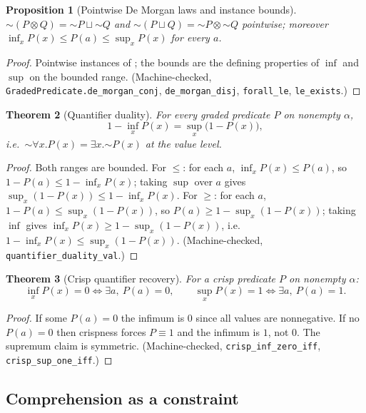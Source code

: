 \documentclass[11pt,a4paper]{article}
\newtheorem{theorem}{Theorem}[section]
\newtheorem{proposition}[theorem]{Proposition}
\newcommand{\negc}{\mathord{\sim}}
\newcommand{\conjc}{\otimes}
\newcommand{\disjc}{\sqcup}
\begin{document}
\begin{proposition}[Pointwise De Morgan laws and instance bounds]
\label{prop:pred-demorgan}
$\negc(P \conjc Q) = \negc P \disjc \negc Q$ and
$\negc(P \disjc Q) = \negc P \conjc \negc Q$ pointwise; moreover
$\inf_x P(x) \leq P(a) \leq \sup_x P(x)$ for every $a$.
\end{proposition}
\begin{proof}
Pointwise instances of ; the bounds are the defining
properties of $\inf$ and $\sup$ on the bounded range.
(Machine-checked, \texttt{GradedPredicate.de\_morgan\_conj},
\texttt{de\_morgan\_disj}, \texttt{forall\_le}, \texttt{le\_exists}.)
\end{proof}

\begin{theorem}[Quantifier duality]
\label{thm:quant-duality}
For every graded predicate $P$ on nonempty $\alpha$,
\[
  1 - \inf_{x} P(x) = \sup_{x} \bigl(1 - P(x)\bigr),
\]
i.e.\ $\negc \forall x. P(x) = \exists x. \negc P(x)$ at the value
level.
\end{theorem}
\begin{proof}
Both ranges are bounded.
For $\leq$: for each $a$, $\inf_x P(x) \leq P(a)$, so
$1 - P(a) \leq 1 - \inf_x P(x)$; taking $\sup$ over $a$ gives
$\sup_x (1 - P(x)) \leq 1 - \inf_x P(x)$.
For $\geq$: for each $a$,
$1 - P(a) \leq \sup_x(1 - P(x))$, so
$P(a) \geq 1 - \sup_x(1 - P(x))$; taking $\inf$ gives
$\inf_x P(x) \geq 1 - \sup_x(1 - P(x))$, i.e.\
$1 - \inf_x P(x) \leq \sup_x(1 - P(x))$.
(Machine-checked, \texttt{quantifier\_duality\_val}.)
\end{proof}

\begin{theorem}[Crisp quantifier recovery]
\label{thm:crisp-quant}
For a crisp predicate $P$ on nonempty $\alpha$:
\[
  \inf_x P(x) = 0 \iff \exists a,\ P(a) = 0,
  \qquad
  \sup_x P(x) = 1 \iff \exists a,\ P(a) = 1.
\]
\end{theorem}
\begin{proof}
If some $P(a) = 0$ the infimum is $0$ since all values are
nonnegative.
If no $P(a) = 0$ then crispness forces $P \equiv 1$ and the infimum is
$1$, not $0$.
The supremum claim is symmetric.
(Machine-checked, \texttt{crisp\_inf\_zero\_iff},
\texttt{crisp\_sup\_one\_iff}.)
\end{proof}

\subsection{Comprehension as a constraint}
\end{document}

